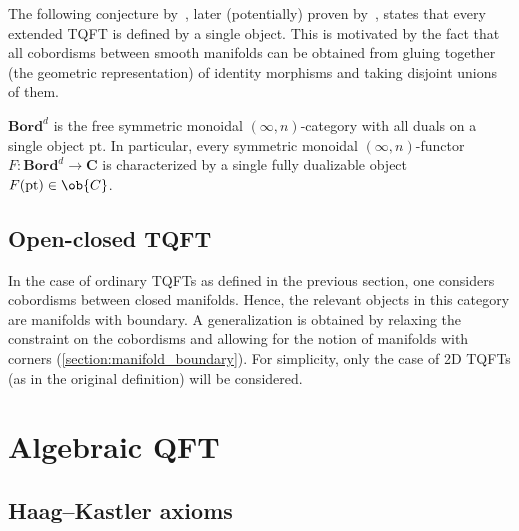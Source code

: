     The following conjecture by~\citet{baez_higherdimensional_1995}, later (potentially) proven by~\citet{lurie_classification_2009,grady_geometric_2022}, states that every extended TQFT is defined by a single object. This is motivated by the fact that all cobordisms between smooth manifolds can be obtained from gluing together (the geometric representation) of identity morphisms and taking disjoint unions of them.
    \begin{theorem}
        $\mathbf{Bord}^d$ is the free symmetric monoidal $(\infty,n)$-category with all duals on a single object $\mathrm{pt}$. In particular, every symmetric monoidal $(\infty,n)$-functor $F:\mathbf{Bord}^d\rightarrow\mathbf{C}$ is characterized by a single fully dualizable object $F(\mathrm{pt})\in\ob{C}$.
    \end{theorem}

\subsection{Open-closed TQFT}

    In the case of ordinary TQFTs as defined in the previous section, one considers cobordisms between closed manifolds. Hence, the relevant objects in this category are manifolds with boundary. A generalization is obtained by relaxing the constraint on the cobordisms and allowing for the notion of manifolds with corners (\cref{section:manifold_boundary}). For simplicity, only the case of 2D TQFTs (as in the original definition) will be considered.


\section{Algebraic QFT}
\subsection{Haag--Kastler axioms}\label{section:haag_kastler}

